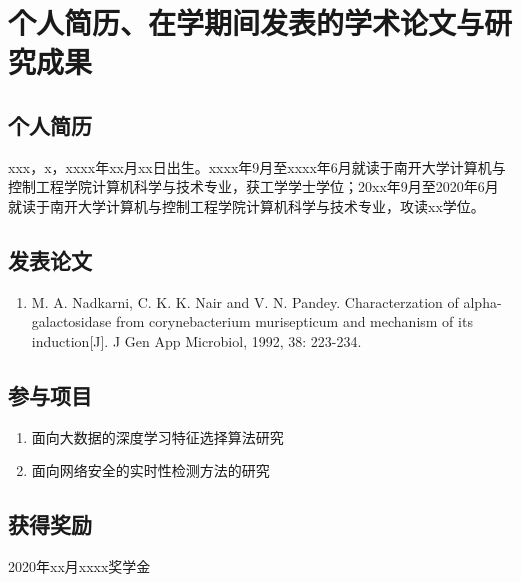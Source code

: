 

\chapter*{个人简历、在学期间发表的学术论文与研究成果}
\section*{个人简历}
xxx，x，xxxx年xx月xx日出生。xxxx年9月至xxxx年6月就读于南开大学计算机与控制工程学院计算机科学与技术专业，获工学学士学位；20xx年9月至2020年6月就读于南开大学计算机与控制工程学院计算机科学与技术专业，攻读xx学位。
\section*{发表论文}
\begin{enumerate}
\renewcommand{\labelenumi}{[\theenumi]}
\item M. A. Nadkarni, C. K. K. Nair and V. N. Pandey. Characterzation of alpha-galactosidase from corynebacterium murisepticum and mechanism of its induction[J]. J Gen App Microbiol, 1992, 38: 223-234.
\end{enumerate}
\section*{参与项目}
\begin{enumerate}
\renewcommand{\labelenumi}{[\theenumi]}
\item 面向大数据的深度学习特征选择算法研究
\item 面向网络安全的实时性检测方法的研究
\end{enumerate}
\section*{获得奖励}
2020年xx月xxxx奖学金